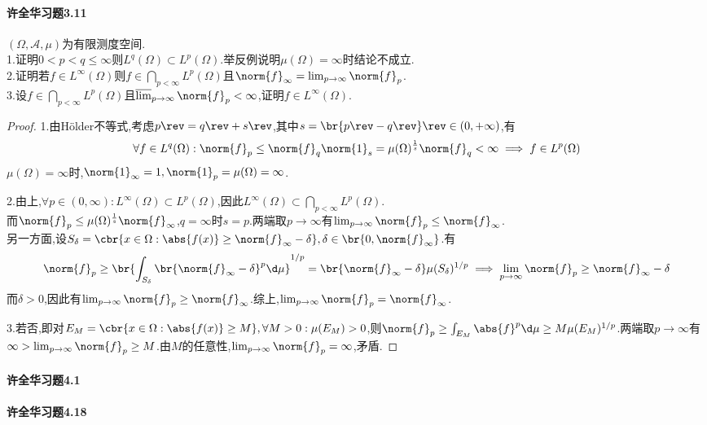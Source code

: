 \documentclass{article}
\begin{document}
\paragraph{许全华习题3.11}$(\Omega,\mathcal{A},\mu)$为有限测度空间.\\
1.证明$0<p<q\leq \infty$则$L^q(\Omega)\subset L^p(\Omega)$.举反例说明$\mu(\Omega)=\infty$时结论不成立.\\
2.证明若$f\in L^\infty(\Omega)$则$f\in\bigcap_{p<\infty}L^p(\Omega)$且$\norm{f}_\infty=\lim_{p\to\infty}\norm{f}_p$.\\
3.设$f\in\bigcap_{p<\infty}L^p(\Omega)$且$\varlimsup_{p\to \infty}\norm{f}_p<\infty$,证明$f\in L^\infty(\Omega)$.

\begin{proof}
    1.由H\"older不等式,考虑$p\rev=q\rev+s\rev$,其中$s=\br{p\rev-q\rev}\rev\in (0,+\infty)$,有$$\forall f\in L^q(\Omega):\norm{f}_p\leq \norm{f}_q\norm{1}_s=\mu(\Omega)^{\frac{1}{s}}\norm{f}_q<\infty\implies f\in L^p(\Omega)$$
    $\mu(\Omega)=\infty$时,$\norm{1}_\infty=1, \norm{1}_p=\mu(\Omega)=\infty$.

    2.由上,$\forall p\in (0,\infty):L^\infty(\Omega)\subset L^p(\Omega)$,因此$L^\infty(\Omega)\subset \bigcap_{p<\infty}L^p(\Omega)$.\\
    而$\norm{f}_p\leq \mu(\Omega)^{\frac{1}{s}}\norm{f}_\infty$,$q=\infty$时$s=p$.两端取$p\to \infty$有$\lim_{p\to \infty}\norm{f}_p\leq \norm{f}_\infty$.\\
    另一方面,设$S_\delta=\cbr{x\in\Omega:\abs{f(x)}\geq \norm{f}_\infty-\delta},\delta\in \br{0,\norm{f}_\infty}$.有$$\norm{f}_p\geq \br{\int_{S_\delta}\br{\norm{f}_\infty-\delta}^p\d \mu}^{1/p}=\br{\norm{f}_\infty-\delta}\mu(S_\delta)^{1/p}\implies \lim_{p\to \infty}\norm{f}_p\geq \norm{f}_\infty-\delta$$
    而$\delta>0$,因此有$\lim_{p\to \infty}\norm{f}_p\geq \norm{f}_\infty$.综上,$\lim_{p\to \infty}\norm{f}_p=\norm{f}_\infty$.

    3.若否,即对$E_M=\cbr{x\in \Omega:\abs{f(x)}\geq M},\forall M>0:\mu(E_M)>0$,则$\norm{f}_p\geq \int_{E_M}\abs{f}^p\d \mu\geq M\mu(E_M)^{1/p}$.两端取$p\to \infty$有$\infty>\lim_{p\to \infty}\norm{f}_p\geq M$.由$M$的任意性,$\lim_{p\to \infty}\norm{f}_p=\infty$,矛盾.
\end{proof}

\paragraph{许全华习题4.1}
\paragraph{许全华习题4.18}
\end{document}
